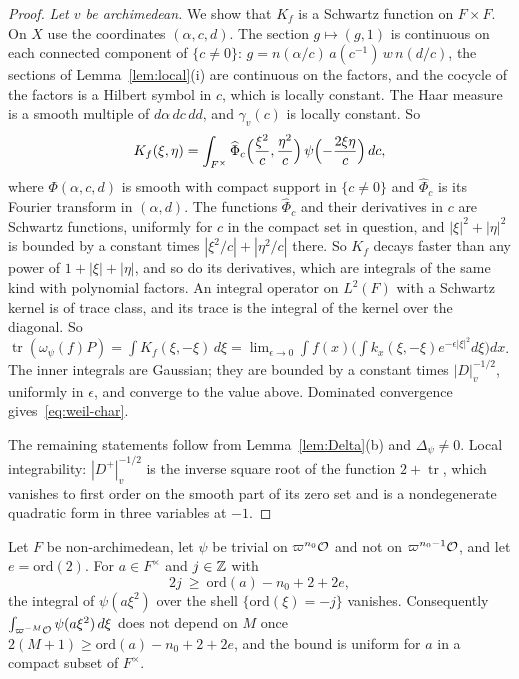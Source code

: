 \begin{proof}
\emph{Let $v$ be archimedean.} We show that $K_f$ is a Schwartz function
on $F\times F$. On $X$ use the coordinates $(\alpha,c,d)$. The section
$g\mapsto(g,1)$ is continuous on each connected component of $\{c\ne0\}$:
$g=n(\alpha/c)\,a(c^{-1})\,w\,n(d/c)$, the sections of
Lemma~\ref{lem:local}(i) are continuous on the factors, and the cocycle
of the factors is a Hilbert symbol in $c$, which is locally constant. The Haar
measure is a smooth
multiple of $d\alpha\,dc\,dd$, and $\gamma_v(c)$ is locally constant. So
\[
K_f(\xi,\eta)=\int_{F^\times}\widehat\Phi_c\Bigl(\frac{\xi^2}c,\frac{\eta^2}c
\Bigr)\,\psi\Bigl(-\frac{2\xi\eta}c\Bigr)\,dc,
\]
where $\Phi(\alpha,c,d)$ is smooth with compact support in $\{c\ne0\}$ and
$\widehat\Phi_c$ is its Fourier transform in $(\alpha,d)$. The functions
$\widehat\Phi_c$ and their derivatives in $c$ are Schwartz functions,
uniformly for $c$ in the compact set in question, and $|\xi|^2+|\eta|^2$
is bounded by a constant times $|\xi^2/c|+|\eta^2/c|$ there. So $K_f$ decays
faster than any power of $1+|\xi|+|\eta|$, and so do its derivatives, which
are integrals of the same kind with polynomial factors. An integral
operator on $L^2(F)$ with a Schwartz kernel is of trace class, and its
trace is the integral of the kernel over the diagonal.
So $\operatorname{tr}(\omega_\psi(f)P)=\int K_f(\xi,-\xi)\,d\xi=\lim_{\epsilon
\to0}\int f(x)\bigl(\int
k_x(\xi,-\xi)e^{-\epsilon|\xi|^2}d\xi\bigr)dx$. The inner integrals are
Gaussian; they are bounded by a constant times $|D|_v^{-1/2}$, uniformly
in $\epsilon$, and converge to the value above. Dominated convergence
gives~\eqref{eq:weil-char}.

The remaining statements follow from Lemma~\ref{lem:Delta}(b) and
$\Delta_\psi\ne0$. Local integrability: $|D^+|_v^{-1/2}$ is the inverse
square root of the function $2+\operatorname{tr}$, which vanishes to first
order on the smooth part of its zero set and is a nondegenerate quadratic
form in three variables at $-1$.
\end{proof}

\begin{lemmaprime}\label{lem:shell}
Let $F$ be non-archimedean, let $\psi$ be trivial on $\varpi^{n_0}\mathcal{O}$ and
not on $\varpi^{n_0-1}\mathcal{O}$, and let $e=\mathrm{ord}(2)$. For $a\in F^\times$
and $j\in\mathbb{Z}$ with
\[
2j\ \ge\ \mathrm{ord}(a)-n_0+2+2e,
\]
the integral of $\psi(a\xi^2)$ over the shell $\{\mathrm{ord}(\xi)=-j\}$
vanishes. Consequently $\int_{\varpi^{-M}\mathcal{O}}\psi(a\xi^2)\,d\xi$ does not
depend on $M$ once $2(M+1)\ge\mathrm{ord}(a)-n_0+2+2e$, and the bound is
uniform for $a$ in a compact subset of $F^\times$.
\end{lemmaprime}

